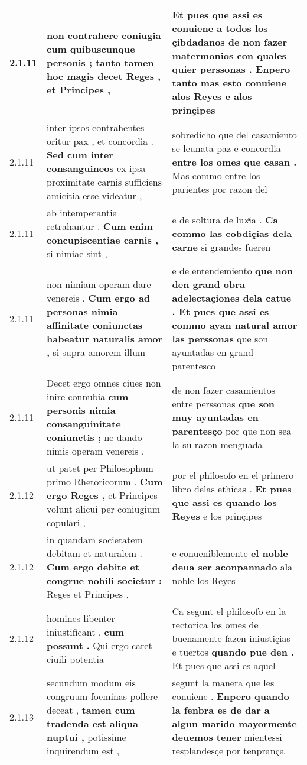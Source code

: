 \begin{tabular}{|p{1cm}|p{6.5cm}|p{6.5cm}|}
2.1.11 & non contrahere coniugia \textbf{ cum quibuscunque personis ; } tanto tamen hoc magis decet Reges , et Principes , & Et pues que assi es conuiene a todos los çibdadanos de non fazer matermonios \textbf{ con quales quier perssonas . } Enpero tanto mas esto conuiene alos Reyes e alos prinçipes \\\hline
2.1.11 & inter ipsos contrahentes oritur pax , et concordia . \textbf{ Sed cum inter consanguineos } ex ipsa proximitate carnis sufficiens amicitia esse videatur , & sobredicho que del casamiento se leunata paz e concordia \textbf{ entre los omes que casan . } Mas commo entre los parientes por razon del \\\hline
2.1.11 & ab intemperantia retrahantur . \textbf{ Cum enim concupiscentiae carnis , } si nimiae sint , & e de soltura de luxͣia . \textbf{ Ca commo las cobdiçias dela carne } si grandes fueren \\\hline
2.1.11 & non nimiam operam dare venereis . \textbf{ Cum ergo ad personas nimia affinitate coniunctas habeatur naturalis amor , } si supra amorem illum & e de entendemiento \textbf{ que non den grand obra adelectaçiones dela catue . Et pues que assi es commo ayan natural amor las perssonas } que son ayuntadas en grand parentesco \\\hline
2.1.11 & Decet ergo omnes ciues non inire connubia \textbf{ cum personis nimia consanguinitate coniunctis ; } ne dando nimis operam venereis , & de non fazer casamientos entre perssonas \textbf{ que son muy ayuntadas en parentesço } por que non sea la su razon menguada \\\hline
2.1.12 & ut patet per Philosophum primo Rhetoricorum . \textbf{ Cum ergo Reges , } et Principes volunt alicui per coniugium copulari , & por el philosofo en el primero libro delas ethicas . \textbf{ Et pues que assi es quando los Reyes } e los prinçipes \\\hline
2.1.12 & in quandam societatem debitam et naturalem . \textbf{ Cum ergo debite et congrue nobili societur : } Reges et Principes , & e conueniblemente \textbf{ el noble deua ser aconpannado } ala noble los Reyes \\\hline
2.1.12 & homines libenter iniustificant , \textbf{ cum possunt . } Qui ergo caret ciuili potentia & Ca segunt el philosofo en la rectorica los omes de buenamente fazen iniustiçias e tuertos \textbf{ quando pue den . } Et pues que assi es aquel \\\hline
2.1.13 & secundum modum eis congruum foeminas pollere deceat , \textbf{ tamen cum tradenda est aliqua nuptui , } potissime inquirendum est , & segunt la manera que les conuiene . \textbf{ Enpero quando la fenbra es de dar a algun marido mayormente deuemos tener } mientessi resplandesçe por tenprança \\\hline

\end{tabular}
